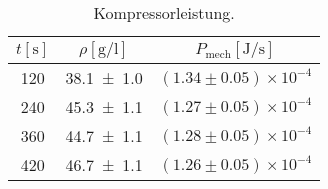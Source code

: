 \begin{table}
  \centering
  \caption{Kompressorleistung.}
  \label{tab:tabelle5}
  \begin{tabular}{c c c}
    \toprule
    {$t [\si{\second}]$} & {$\rho [\si{\gram\per\litre}]$} & {$P_{\text{mech}} [\si{\joule\per\second}]$} \\
    \midrule
    \num{120}            & \num{38.1 +- 1.0}               & $(1.34 \pm 0.05) \times 10^{-4}$               \\
    \num{240}            & \num{45.3 +- 1.1}               & $(1.27 \pm 0.05) \times 10^{-4}$               \\
    \num{360}            & \num{44.7 +- 1.1}               & $(1.28 \pm 0.05) \times 10^{-4}$               \\
    \num{420}            & \num{46.7 +- 1.1}               & $(1.26 \pm 0.05) \times 10^{-4}$               \\
    \bottomrule
  \end{tabular}
\end{table}